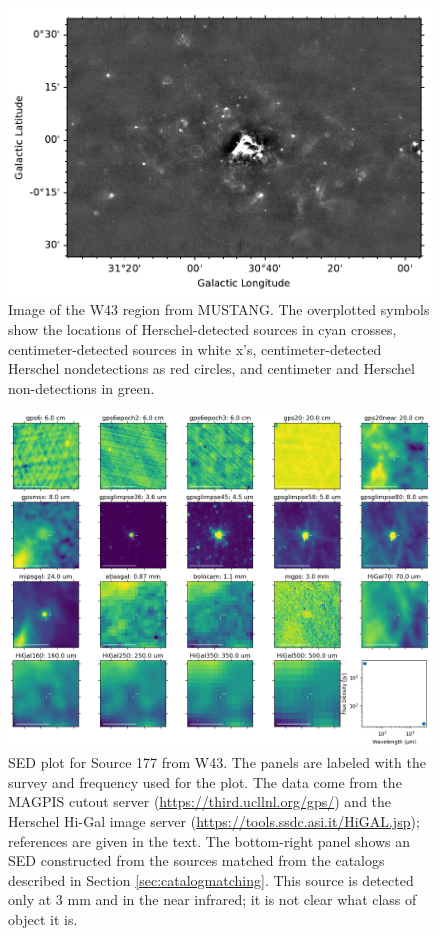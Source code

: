 \documentclass[twocolumn]{aastex62}
\begin{document}
\begin{figure}[htp]
    \includegraphics[width=17cm]{figures/W43_catalog_overlay.pdf}
\caption{Image of the W43 region from MUSTANG.  The overplotted symbols show the locations
of Herschel-detected sources in cyan crosses, centimeter-detected sources in white x's, centimeter-detected Herschel nondetections as red circles,
and centimeter and Herschel non-detections in green.}
\label{fig:w43overview}
\end{figure}

\begin{figure}[htp]
    \includegraphics[width=17cm]{figures/SED_plot_G031_177.png}
\caption{SED plot for Source 177 from W43.  The panels are labeled with the
survey and frequency used for the plot.  The data come from the MAGPIS cutout
server (\url{https://third.ucllnl.org/gps/}) and the Herschel Hi-Gal image
server (\url{https://tools.ssdc.asi.it/HiGAL.jsp}); references are given in the
text.  The bottom-right panel shows an SED constructed from the sources matched
from the catalogs described in Section \ref{sec:catalogmatching}.
This source is detected only at 3 mm and in the near infrared; it is not clear
what class of object it is.
}
\label{fig:sed177}
\end{figure}
\end{document}

